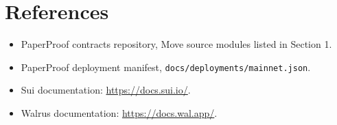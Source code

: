 \documentclass[11pt]{article}
\newcommand{\code}[1]{\texttt{#1}}
\begin{document}
\section{References}

\begin{itemize}[leftmargin=*]
  \item PaperProof contracts repository, Move source modules listed in Section 1.
  \item PaperProof deployment manifest, \code{docs/deployments/mainnet.json}.
  \item Sui documentation: \url{https://docs.sui.io/}.
  \item Walrus documentation: \url{https://docs.wal.app/}.
\end{itemize}
\end{document}
